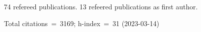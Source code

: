 74 refereed publications. 13 refeered publications as first author.

Total citations~=~3169; h-index~=~31 (2023-03-14)
